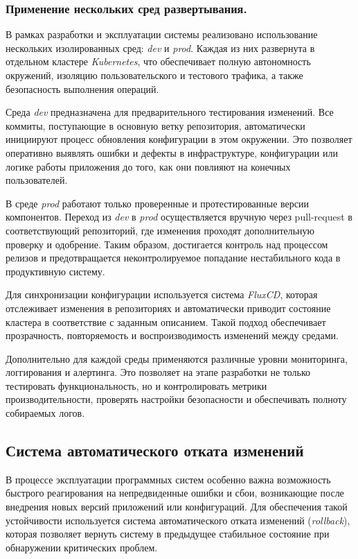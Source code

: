\subsubsection{Применение нескольких сред развертывания.}
В рамках разработки и эксплуатации системы реализовано использование нескольких изолированных сред: \textit{dev} и \textit{prod}. Каждая из них развернута в отдельном кластере \textit{Kubernetes}, что обеспечивает полную автономность окружений, изоляцию пользовательского и тестового трафика, а также безопасность выполнения операций.

Среда \textit{dev} предназначена для предварительного тестирования изменений. Все коммиты, поступающие в основную ветку репозитория, автоматически инициируют процесс обновления конфигурации в этом окружении. Это позволяет оперативно выявлять ошибки и дефекты в инфраструктуре, конфигурации или логике работы приложения до того, как они повлияют на конечных пользователей.

В среде \textit{prod} работают только проверенные и протестированные версии компонентов. Переход из \textit{dev} в \textit{prod} осуществляется вручную через pull-request в соответствующий репозиторий, где изменения проходят дополнительную проверку и одобрение. Таким образом, достигается контроль над процессом релизов и предотвращается неконтролируемое попадание нестабильного кода в продуктивную систему.

Для синхронизации конфигурации используется система \textit{FluxCD}, которая отслеживает изменения в репозиториях и автоматически приводит состояние кластера в соответствие с заданным описанием. Такой подход обеспечивает прозрачность, повторяемость и воспроизводимость изменений между средами.

Дополнительно для каждой среды применяются различные уровни мониторинга, логгирования и алертинга. Это позволяет на этапе разработки не только тестировать функциональность, но и контролировать метрики производительности, проверять настройки безопасности и обеспечивать полноту собираемых логов.


\subsection{Система автоматического отката изменений}

В процессе эксплуатации программных систем особенно важна возможность быстрого реагирования на непредвиденные ошибки и сбои, возникающие после внедрения новых версий приложений или конфигураций. Для обеспечения такой устойчивости используется система автоматического отката изменений (\textit{rollback}), которая позволяет вернуть систему в предыдущее стабильное состояние при обнаружении критических проблем.

